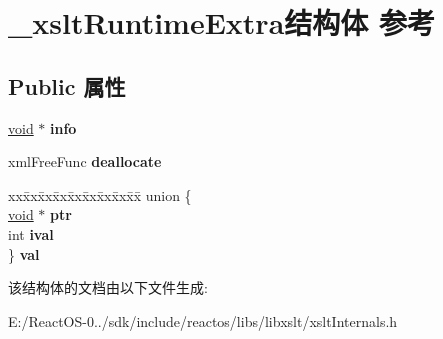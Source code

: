 \hypertarget{struct__xslt_runtime_extra}{}\section{\+\_\+xslt\+Runtime\+Extra结构体 参考}
\label{struct__xslt_runtime_extra}
\subsection*{Public 属性}
\begin{DoxyCompactItemize}
\item 
\mbox{\label{struct__xslt_runtime_extra_abba0b7bb7e387daa73ea55856b211952}} 
\hyperlink{interfacevoid}{void} $\ast$ {\bfseries info}
\item 
\mbox{\label{struct__xslt_runtime_extra_a37d43c4990a99e8dbb89dd3fb707db7d}} 
xml\+Free\+Func {\bfseries deallocate}
\item 
\mbox{\label{struct__xslt_runtime_extra_a9c24face3a2a1588e22fb171a0bc4da7}} 
\begin{tabbing}
xx\=xx\=xx\=xx\=xx\=xx\=xx\=xx\=xx\=\kill
union \{\\
\>\hyperlink{interfacevoid}{void} $\ast$ {\bfseries ptr}\\
\>int {\bfseries ival}\\
\} {\bfseries val}\\

\end{tabbing}\end{DoxyCompactItemize}


该结构体的文档由以下文件生成\+:\begin{DoxyCompactItemize}
\item 
E\+:/\+React\+O\+S-\/0../sdk/include/reactos/libs/libxslt/xslt\+Internals.\+h\end{DoxyCompactItemize}

